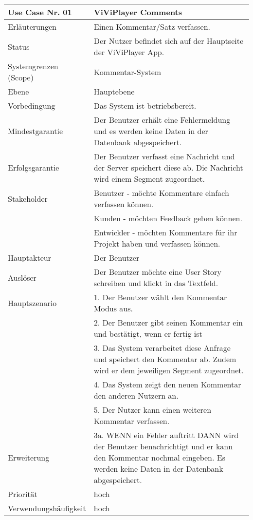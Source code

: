 \begin{tabularx}{\linewidth}{|l|X|}
	\hline
	Use Case Nr. 01			& \textbf{ViViPlayer Comments} \\ \hline
	Erläuterungen			&  Einen Kommentar/Satz verfassen. \\ \hline
	Status					&  Der Nutzer befindet sich auf der Hauptseite der ViViPlayer App. \\ \hline
	Systemgrenzen (Scope)	&  Kommentar-System\\ \hline
	Ebene					&  Hauptebene\\ \hline
	Vorbedingung			&  Das System ist betriebsbereit.\\ \hline
	Mindestgarantie			&  Der Benutzer erhält eine Fehlermeldung und es werden keine Daten in der Datenbank abgespeichert.\\ \hline
	Erfolgsgarantie			&  Der Benutzer verfasst eine Nachricht und der Server speichert diese ab. Die Nachricht wird einem Segment zugeordnet.\\ \hline
	Stakeholder				&  Benutzer - möchte Kommentare einfach verfassen können.\\ 
                            &  Kunden - möchten Feedback geben können. \\
                            &   Entwickler - möchten Kommentare für ihr Projekt haben und verfassen können. \\ \hline
	Hauptakteur				&  Der Benutzer\\ \hline
	Auslöser				&  Der Benutzer möchte eine User Story schreiben und klickt in das Textfeld. \\ \hline	
	Hauptszenario			&  1. Der Benutzer wählt den Kommentar Modus aus. \\
                            &  2. Der Benutzer gibt seinen Kommentar ein und bestätigt, wenn er fertig ist\\
							&  3. Das System verarbeitet diese Anfrage und speichert den Kommentar ab. Zudem wird er dem jeweiligen Segment zugeordnet. \\
							&  4. Das System zeigt den neuen Kommentar den anderen Nutzern an.\\
							&  5. Der Nutzer kann einen weiteren Kommentar verfassen. \\ \hline
	Erweiterung				& 3a. WENN ein Fehler auftritt DANN wird der Benutzer benachrichtigt und er kann den Kommentar nochmal eingeben. Es werden keine Daten in der Datenbank abgespeichert.\\ \hline
	Priorität				&  hoch \\ \hline
	Verwendungshäufigkeit	&  hoch \\ \hline
\end{tabularx}

